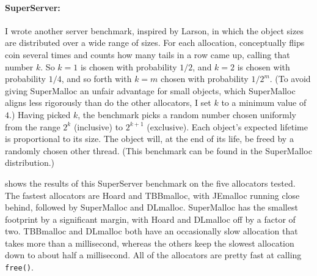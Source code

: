 \documentclass[natbib,sort&compress,10pt]{sigplanconf}
\newcommand{\code}[1]{\texttt{#1}}
\begin{document}
{\paragraph{SuperServer:}} I wrote another server benchmark, inspired
by Larson, in which the object sizes are distributed over a wide range
of sizes.  For each allocation, conceptually flips coin several times
and counts how many tails in a row came up, calling that number $k$.
So $k=1$ is chosen with probability $1/2$, and $k=2$ is chosen with
probability $1/4$, and so forth with $k=m$ chosen with probability
$1/2^m$.  (To avoid giving SuperMalloc an unfair advantage for small
objects, which SuperMalloc aligns less rigorously than do the other
allocators, I set $k$ to a minimum value of $4$.)  Having picked $k$,
the benchmark picks a random number chosen uniformly from the range
$2^k$ (inclusive) to $2^{k+1}$ (exclusive).  Each object's expected
lifetime is proportional to its size.  The object will, at the end of
its life, be freed by a randomly chosen other thread.  (This benchmark
can be found in the SuperMalloc distribution.)

 shows the results of this SuperServer benchmark on the
five allocators tested.  The fastest allocators are Hoard and
TBBmalloc, with JEmalloc running close behind, followed by SuperMalloc
and DLmalloc.  SuperMalloc has the smallest footprint by a significant
margin, with Hoard and DLmalloc off by a factor of two.  TBBmalloc and
DLmalloc both have an occasionally slow allocation that takes more
than a millisecond, whereas the others keep the slowest allocation
down to about half a millisecond.  All of the allocators are pretty
fast at calling \code{free()}.
\end{document}
